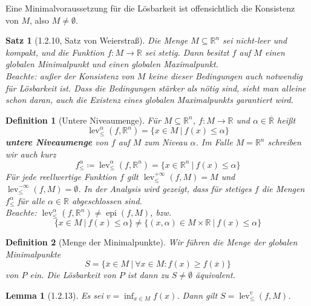 \documentclass[12pt]{extreport} %
\newcommand{\R}{\mathbb{R}}
\theoremstyle{named}
\theoremstyle{nnamed}
\theoremstyle{itshape}
\newtheorem*{satz}{Satz}
\newtheorem*{definition}{Definition}
\theoremstyle{normal}
\newtheorem*{lemma}{Lemma}
\begin{document}
Eine Minimalvoraussetzung für die Lösbarkeit ist offensichtlich die Konsistenz von $M$, also $M \neq \emptyset$.

\begin{satz}[1.2.10, Satz von Weierstraß]
	Die Menge $M \subseteq \R^n$ sei nicht-leer und kompakt, und die Funktion $f \colon M \rightarrow \R$ sei stetig. Dann besitzt $f$ auf $M$ einen globalen Minimalpunkt und einen globalen Maximalpunkt. ~\\
	
	Beachte: außer der Konsistenz von $M$ keine dieser Bedingungen auch notwendig für Lösbarkeit ist.	Dass die Bedingungen stärker als nötig sind, sieht man alleine schon daran, auch die Existenz eines globalen Maximalpunkts garantiert wird.
\end{satz}

\begin{definition}[Untere Niveaumenge]
	Für $M \subseteq \R^n$, $f \colon M \rightarrow \R$ und $\alpha \in \overline{\R}$ heißt
	$$ \operatorname{lev}_{\leq}^{\alpha}(f, \R^n) = \big\{ x \in M ~|~f(x) \leq \alpha \big\} $$
	\textbf{untere Niveaumenge} von $f$ auf $M$ zum Niveau $\alpha$. Im Falle $M = \R^n$ schreiben wir auch kurz
	$$ f_{\leq}^\alpha \coloneqq \operatorname{lev}_{\leq}^{\alpha}(f, \R^n) = \big\{ x \in \R^n ~|~ f(x) \leq \alpha \big\} $$
	Für jede reellwertige Funktion $f$ gilt $\operatorname{lev}_{\leq}^{+\infty}(f, M) = M$ und $\operatorname{lev}_{\leq}^{-\infty}(f, M) = \emptyset$. In der Analysis wird gezeigt, dass für stetiges $f$ die Mengen $f_{\leq}^{\alpha}$ für alle $\alpha \in \R$ abgeschlossen sind. ~\\
	
	Beachte: $\operatorname{lev}_{\leq}^{\alpha}(f, \R^n) \neq \operatorname{epi}(f, M)$, bzw.
	$$ \big\{ x \in M ~|~f(x) \leq \alpha \big\} \neq \big\{ (x, \alpha) \in M \times \R ~|~f(x) \leq \alpha \big\} $$ 
\end{definition}

\begin{definition}[Menge der Minimalpunkte]
	Wir führen die Menge der globalen Minimalpunkte
	$$ S = \big\{ \overline{x} \in M ~|~ \forall x \in M : f(x) \geq f(\overline{x}) \big\} $$
	von $P$ ein. Die Lösbarkeit von $P$ ist dann zu $S \neq \emptyset$ äquivalent.
\end{definition}

\begin{lemma}[1.2.13]
	Es sei $v = \inf_{x \in M} f(x)$. Dann gilt $S = \operatorname{lev}_{\leq}^{v}(f, M)$.	
\end{lemma}
\end{document}
